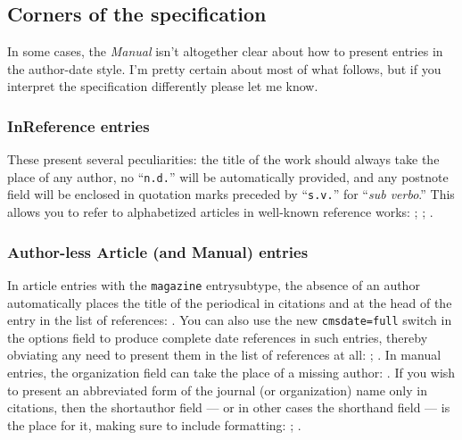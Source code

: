 \documentclass[a4paper,12pt]{report}
\begin{document}
\subsection*{Corners of the specification}
\label{sec:corners}

In some cases, the \emph{Manual} isn't altogether clear about how to
present entries in the author-date style.  I'm pretty certain about
most of what follows, but if you interpret the specification
differently please let me know.

\subsubsection*{InReference entries}
\label{sec:inref}

These present several peculiarities: the title of the work should
always take the place of any author, no
\enquote{\texttt{n.d.}\hspace{-2pt}} will be automatically provided,
and any postnote field will be enclosed in quotation marks preceded by
\enquote{\texttt{s.v.}\hspace{-2pt}} for \enquote{\emph{sub verbo}.}
This allows you to refer to alphabetized articles in well-known
reference works: \autocite[Hume, David]{ency:britannica};
\autocite[Sibelius, Jean]{grove:sibelius};
\autocite[BibTeX]{wikiped:bibtex}.

\subsubsection*{Author-less Article (and Manual) entries}
\label{sec:authless:art}

In article entries with the \texttt{magazine} entrysubtype, the
absence of an author automatically places the title of the periodical
in citations and at the head of the entry in the list of references:
\autocite{gourmet:052006}.  You can also use the new
\texttt{cmsdate=full} switch in the \textsf{options} field to produce
complete date references in such entries, thereby obviating any need
to present them in the list of references at all:
\autocite{lakeforester:pushcarts}; \autocite{nyt:trevorobit}.  In
\textsf{manual} entries, the \textsf{organization} field can take the
place of a missing \textsf{author}: \autocite{dyna:browser}.  If you
wish to present an abbreviated form of the journal (or organization)
name only in citations, then the \textsf{shortauthor} field --- or in
other cases the \textsf{shorthand} field --- is the place for it,
making sure to include formatting: \autocite{unsigned:ranke};
\autocite{bsi:abbreviation:15}.
\end{document}

